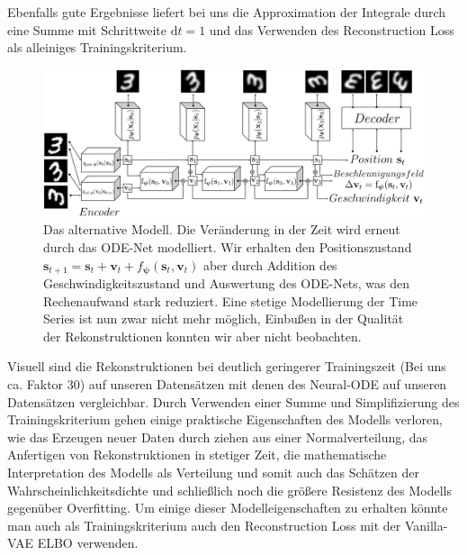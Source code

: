 \documentclass[12pt]{article}
\begin{document}
	Ebenfalls gute Ergebnisse liefert bei uns die Approximation der Integrale durch eine Summe mit Schrittweite $\mathrm{d}t=1$ und das Verwenden des Reconstruction Loss als alleiniges Trainingskriterium.\\
	\begin{figure}[h!]
		\centering
		\includegraphics[scale=0.41]{ODE2VAE_Modell}
		\captionsetup{labelformat=empty}
		\caption{Das alternative Modell. Die Veränderung in der Zeit wird erneut durch das ODE-Net modelliert. Wir erhalten den Positionszustand $\mathbf{s}_{t+1} = \mathbf{s}_{t} + \mathbf{v}_{t} + f_{\boldsymbol\psi}(\mathbf{s}_{t}, \mathbf{v}_{t})$ aber durch Addition des Geschwindigkeitszustand und Auswertung des ODE-Nets, was den Rechenaufwand stark reduziert. Eine stetige Modellierung der Time Series ist nun zwar nicht mehr möglich, Einbußen in der Qualität der Rekonstruktionen konnten wir aber nicht beobachten.}
	\end{figure}

	Visuell sind die Rekonstruktionen bei deutlich geringerer Trainingszeit (Bei uns ca. Faktor 30) auf unseren Datensätzen mit denen des Neural-ODE auf unseren Datensätzen vergleichbar. 
	Durch Verwenden einer Summe und Simplifizierung des Trainingskriterium gehen einige praktische Eigenschaften des Modells verloren, wie das Erzeugen neuer Daten durch ziehen aus einer Normalverteilung, das Anfertigen von Rekonstruktionen in stetiger Zeit, die mathematische Interpretation des Modells als Verteilung und somit auch das Schätzen der Wahrscheinlichkeitsdichte und schließlich noch die größere Resistenz des Modells gegenüber Overfitting.
	Um einige dieser Modelleigenschaften zu erhalten könnte man auch als Trainingskriterium auch den Reconstruction Loss mit der Vanilla-VAE ELBO verwenden.


	\newpage
\end{document}
